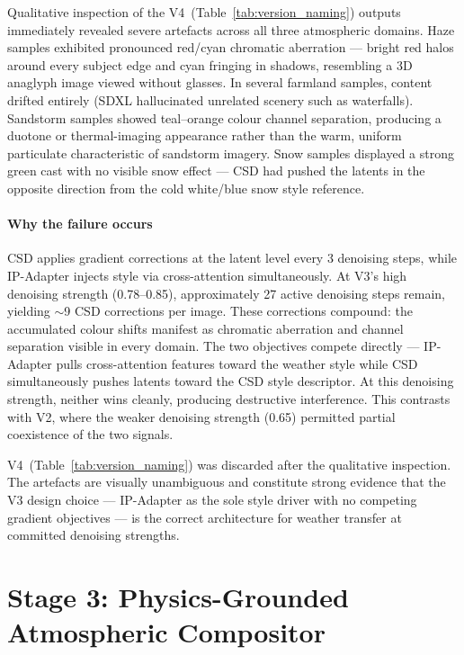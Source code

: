 \noindent Qualitative inspection of the V4~(Table~\ref{tab:version_naming}) outputs immediately revealed severe artefacts across all three atmospheric domains. Haze samples exhibited pronounced red/cyan chromatic aberration — bright red halos around every subject edge and cyan fringing in shadows, resembling a 3D anaglyph image viewed without glasses. In several farmland samples, content drifted entirely (SDXL hallucinated unrelated scenery such as waterfalls). Sandstorm samples showed teal--orange colour channel separation, producing a duotone or thermal-imaging appearance rather than the warm, uniform particulate characteristic of sandstorm imagery. Snow samples displayed a strong green cast with no visible snow effect — CSD had pushed the latents in the opposite direction from the cold white/blue snow style reference.

\paragraph{Why the failure occurs}
CSD applies gradient corrections at the latent level every 3 denoising steps, while IP-Adapter injects style via cross-attention simultaneously. At V3's high denoising strength (0.78--0.85), approximately 27 active denoising steps remain, yielding $\sim$9 CSD corrections per image. These corrections compound: the accumulated colour shifts manifest as chromatic aberration and channel separation visible in every domain. The two objectives compete directly — IP-Adapter pulls cross-attention features toward the weather style while CSD simultaneously pushes latents toward the CSD style descriptor. At this denoising strength, neither wins cleanly, producing destructive interference. This contrasts with V2, where the weaker denoising strength (0.65) permitted partial coexistence of the two signals.

\noindent V4~(Table~\ref{tab:version_naming}) was discarded after the qualitative inspection. The artefacts are visually unambiguous and constitute strong evidence that the V3 design choice — IP-Adapter as the sole style driver with no competing gradient objectives — is the correct architecture for weather transfer at committed denoising strengths.

\FloatBarrier
\section{Stage 3: Physics-Grounded Atmospheric Compositor}
\label{sec:stage3_physics}

